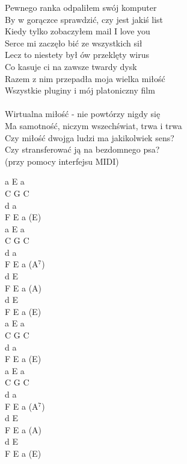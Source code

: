 \documentclass[a5paper, 10pt]{book}
\begin{document}
\begin{minipage}[t]{0.8\textwidth}
  Pewnego ranka odpaliłem swój komputer\\
  By w gorączce sprawdzić, czy jest jakiś list\\
  Kiedy tylko zobaczyłem mail I love you\\
  Serce mi zaczęło bić ze wszystkich sił\\
  Lecz to niestety był ów przeklęty wirus\\
  Co kasuje ci na zawsze twardy dysk\\
  Razem z nim przepadła moja wielka miłość\\
  Wszystkie pluginy i mój platoniczny film\\
  \\
  \hspace*{5mm}Wirtualna miłość - nie powtórzy nigdy się\\
  \hspace*{5mm}Ma samotność, niczym wszechświat, trwa i trwa\\
  \hspace*{5mm}Czy miłość dwojga ludzi ma jakikolwiek sens?\\
  \hspace*{5mm}Czy stransferować ją na bezdomnego psa?\\
  \hspace*{5mm}(przy pomocy interfejsu MIDI)

\end{minipage}
\begin{minipage}[t]{0.2\textwidth}
  a E a\\
  C G C\\
  d a\\
  F E a (E)\\
  a E a\\
  C G C\\
  d a\\
  F E a (A$^7$)\\

  d E\\
  F E a (A)\\
  d E\\
  F E a (E)\\

  a E a\\
  C G C\\
  d a\\
  F E a (E)\\
  a E a\\
  C G C\\
  d a\\
  F E a (A$^7$)\\

  d E\\
  F E a (A)\\
  d E\\
  F E a (E)\\
\end{minipage}
\end{document}
